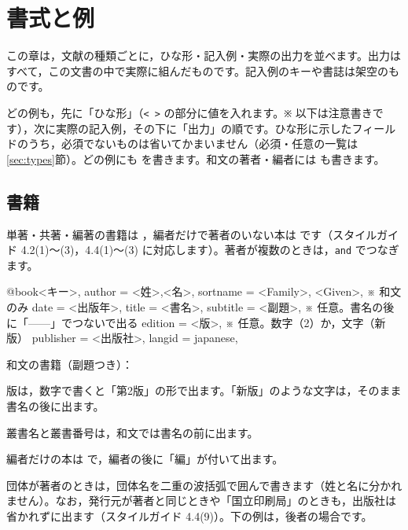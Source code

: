 \section{書式と例}\label{sec:examples}
この章は，文献の種類ごとに，ひな形・記入例・実際の出力を並べます。出力はすべて，この文書の中で実際に組んだものです。記入例のキーや書誌は架空のものです。

どの例も，先に「ひな形」（\texttt{<\ >} の部分に値を入れます。\texttt{※} 以下は注意書きです），次に実際の記入例，その下に「出力」の順です。ひな形に示したフィールドのうち，必須でないものは省いてかまいません（必須・任意の一覧は\ref{sec:types}節）。どの例にも  を書きます。和文の著者・編者には  も書きます。

\subsection{書籍}\label{sec:book}
単著・共著・編著の書籍は ，編者だけで著者のいない本は  です（スタイルガイド 4.2(1)〜(3)，4.4(1)〜(3) に対応します）。著者が複数のときは，\texttt{and} でつなぎます。

\begin{bibtemplate}
@book{<キー>,
  author    = {<姓>,<名>},
  sortname  = {<Family>, <Given>},   ※ 和文のみ
  date      = {<出版年>},
  title     = {<書名>},
  subtitle  = {<副題>},              ※ 任意。書名の後に「——」でつないで出る
  edition   = {<版>},                ※ 任意。数字（2）か，文字（新版）
  publisher = {<出版社>},
  langid    = {japanese},
}
\end{bibtemplate}

和文の書籍（副題つき）：


版は，数字で書くと「第2版」の形で出ます。「新版」のような文字は，そのまま書名の後に出ます。


叢書名と叢書番号は，和文では書名の前に出ます。


編者だけの本は  で，編者の後に「編」が付いて出ます。


団体が著者のときは，団体名を二重の波括弧で囲んで書きます（姓と名に分かれません）。なお，発行元が著者と同じときや「国立印刷局」のときも，出版社は省かれずに出ます（スタイルガイド 4.4(9)）。下の例は，後者の場合です。

